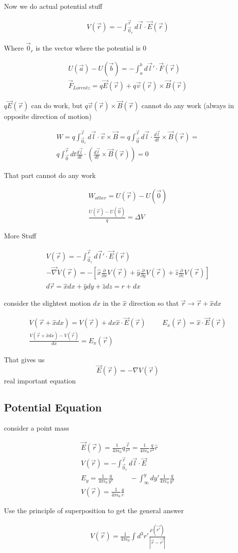 \documentclass[fleqn]{report}
\newcommand{\hp}{\hspace{1cm}}
\newcommand{\del}{\partial}
\newcommand{\equations} [1] {
\begin{gather*}
#1
\end{gather*}
}
\begin{document}
Now we do actual potential stuff 
\equations{
    V(\vec r) = - \int^{\vec r}_{\vec 0_r} d \vec l \cdot \vec E(\vec r)
}
Where $\vec 0_r$ is the vector where the potential is 0
\equations{
    U(\vec a) - U(\vec b) = - \int^b_a d \vec l' \cdot \vec F(\vec r)
    \\
    \vec F_{Lorentz} = q \vec E(\vec r) + q \vec v(\vec r) \times \vec B(\vec r)
}
$q \vec E(\vec r)$ can do work, but $q \vec v(\vec r) \times \vec B(\vec r)$ 
cannot do any work (always in opposite direction of motion)

\equations{
    W 
    =
    q \int^{\vec r}_{\vec 0_{r}} d \vec l \cdot 
    \vec v \times \vec B 
    = 
    q \int^{\vec r}_{\vec 0} d \vec l \cdot 
    \frac{d \vec l}{dt} \times \vec B(\vec r)
    =
    \\
    q \int^{\vec r}_{\vec 0} dt \frac{d \vec l}{dt} \cdot 
    (\frac{d \vec l}{dt} \times \vec B(\vec r))
    = 0
}
That part cannot do any work 
\equations{
    W_{other} = U(\vec r) - U(\vec 0)
    \\
    \frac{U(\vec r) - U(\vec 0)}{q} = \Delta V
}
More Stuff 
\equations{
    V(\vec r) = - \int^{\vec r}_{\vec 0_r} d \vec l' \cdot \vec E(\vec r)
    \\
    - \vec \nabla V(\vec r) 
    =
    -
    \left[
        \hat x \frac{\del}{\del x} V(\vec r) + 
        \hat y \frac{\del}{\del y} V(\vec r) +
        \hat z \frac{\del}{\del z} V(\vec r)
    \right]
    \\
    d \vec r = \hat x dx + \hat y dy + \hat z dz 
    =
    r + dx 
}
consider the slightest motion $dx$ in the $\hat x$ direction so that 
$\vec r \to \vec r + \hat x dx$
\equations{
    V(\vec r + \hat x dx) = V(\vec r) + dx \hat x \cdot \vec E(\vec r)
    \hp 
    E_x(\vec r) = \hat x \cdot \vec E(\vec r)
    \\
    \frac{V(\vec r + \hat x dx) - V(\vec r)}{dx} = E_x(\vec r)
}
That gives us 
\[
\vec E(\vec r) = - \nabla V(\vec r)
\]
real important equation 

\subsection{Potential Equation}
consider a point mass 
\equations{
    \vec E(\vec r) = 
    \frac{1}{4 \pi \epsilon_0} q \frac{\vec r}{r^3} = 
    \frac{1}{4 \pi \epsilon_0} \frac{q}{r^2} \hat r
    \\
    V(\vec r) = - \int^{\vec r}_{\vec 0_r} d \vec l \cdot \vec E 
    \\
    E_y = \frac{1}{4 \pi \epsilon_0} \frac{q}{y^2}
    \hp 
    - \int^y_\infty dy' \frac{1}{4 \pi \epsilon_0} \frac{q}{y^2}
    \\
    V(\vec r) = \frac{1}{4 \pi \epsilon_0} \frac{q}{r}
}
Use the principle of superposition to get the general answer 
\equations{
    V(\vec r) = \frac{1}{ 4 \pi \epsilon_0} 
    \int d^3 r' \frac{\rho(\vec {r'})}{|\vec r - \vec {r'}|}
}
\end{document}
